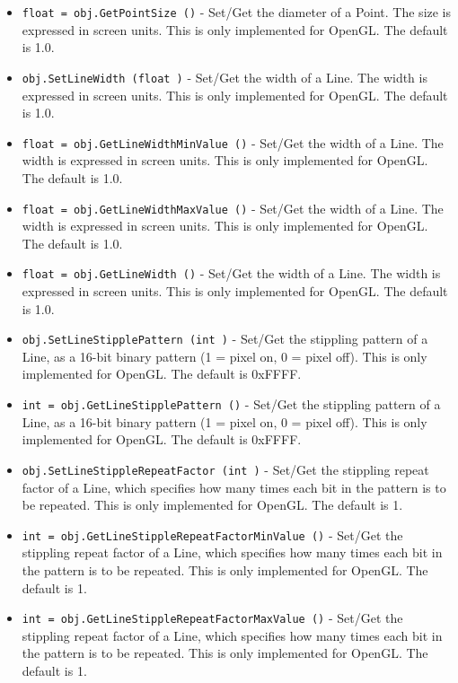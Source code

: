 \begin{itemize}
\item  \verb|float = obj.GetPointSize ()| -  Set/Get the diameter of a Point. The size is expressed in screen units.
 This is only implemented for OpenGL. The default is 1.0.

\item  \verb|obj.SetLineWidth (float )| -  Set/Get the width of a Line. The width is expressed in screen units.
 This is only implemented for OpenGL. The default is 1.0.

\item  \verb|float = obj.GetLineWidthMinValue ()| -  Set/Get the width of a Line. The width is expressed in screen units.
 This is only implemented for OpenGL. The default is 1.0.

\item  \verb|float = obj.GetLineWidthMaxValue ()| -  Set/Get the width of a Line. The width is expressed in screen units.
 This is only implemented for OpenGL. The default is 1.0.

\item  \verb|float = obj.GetLineWidth ()| -  Set/Get the width of a Line. The width is expressed in screen units.
 This is only implemented for OpenGL. The default is 1.0.

\item  \verb|obj.SetLineStipplePattern (int )| -  Set/Get the stippling pattern of a Line, as a 16-bit binary pattern 
 (1 = pixel on, 0 = pixel off).
 This is only implemented for OpenGL. The default is 0xFFFF.

\item  \verb|int = obj.GetLineStipplePattern ()| -  Set/Get the stippling pattern of a Line, as a 16-bit binary pattern 
 (1 = pixel on, 0 = pixel off).
 This is only implemented for OpenGL. The default is 0xFFFF.

\item  \verb|obj.SetLineStippleRepeatFactor (int )| -  Set/Get the stippling repeat factor of a Line, which specifies how
 many times each bit in the pattern is to be repeated.
 This is only implemented for OpenGL. The default is 1.

\item  \verb|int = obj.GetLineStippleRepeatFactorMinValue ()| -  Set/Get the stippling repeat factor of a Line, which specifies how
 many times each bit in the pattern is to be repeated.
 This is only implemented for OpenGL. The default is 1.

\item  \verb|int = obj.GetLineStippleRepeatFactorMaxValue ()| -  Set/Get the stippling repeat factor of a Line, which specifies how
 many times each bit in the pattern is to be repeated.
 This is only implemented for OpenGL. The default is 1.


\end{itemize}

